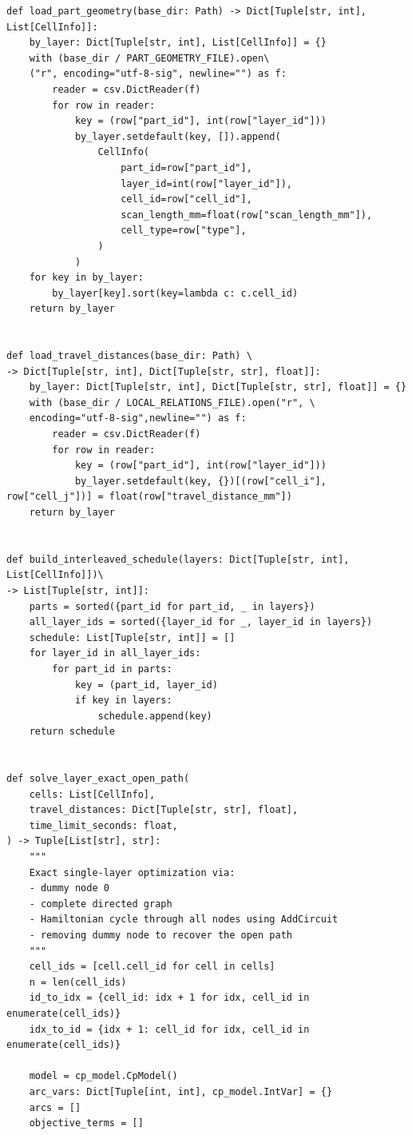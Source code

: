 \documentclass[a4paper, 12pt]{ctexart}
\begin{document}
\begin{verbatim}
def load_part_geometry(base_dir: Path) -> Dict[Tuple[str, int], List[CellInfo]]:
    by_layer: Dict[Tuple[str, int], List[CellInfo]] = {}
    with (base_dir / PART_GEOMETRY_FILE).open\
    ("r", encoding="utf-8-sig", newline="") as f:
        reader = csv.DictReader(f)
        for row in reader:
            key = (row["part_id"], int(row["layer_id"]))
            by_layer.setdefault(key, []).append(
                CellInfo(
                    part_id=row["part_id"],
                    layer_id=int(row["layer_id"]),
                    cell_id=row["cell_id"],
                    scan_length_mm=float(row["scan_length_mm"]),
                    cell_type=row["type"],
                )
            )
    for key in by_layer:
        by_layer[key].sort(key=lambda c: c.cell_id)
    return by_layer


def load_travel_distances(base_dir: Path) \
-> Dict[Tuple[str, int], Dict[Tuple[str, str], float]]:
    by_layer: Dict[Tuple[str, int], Dict[Tuple[str, str], float]] = {}
    with (base_dir / LOCAL_RELATIONS_FILE).open("r", \
    encoding="utf-8-sig",newline="") as f:
        reader = csv.DictReader(f)
        for row in reader:
            key = (row["part_id"], int(row["layer_id"]))
            by_layer.setdefault(key, {})[(row["cell_i"], row["cell_j"])] = float(row["travel_distance_mm"])
    return by_layer


def build_interleaved_schedule(layers: Dict[Tuple[str, int], List[CellInfo]])\
-> List[Tuple[str, int]]:
    parts = sorted({part_id for part_id, _ in layers})
    all_layer_ids = sorted({layer_id for _, layer_id in layers})
    schedule: List[Tuple[str, int]] = []
    for layer_id in all_layer_ids:
        for part_id in parts:
            key = (part_id, layer_id)
            if key in layers:
                schedule.append(key)
    return schedule


def solve_layer_exact_open_path(
    cells: List[CellInfo],
    travel_distances: Dict[Tuple[str, str], float],
    time_limit_seconds: float,
) -> Tuple[List[str], str]:
    """
    Exact single-layer optimization via:
    - dummy node 0
    - complete directed graph
    - Hamiltonian cycle through all nodes using AddCircuit
    - removing dummy node to recover the open path
    """
    cell_ids = [cell.cell_id for cell in cells]
    n = len(cell_ids)
    id_to_idx = {cell_id: idx + 1 for idx, cell_id in enumerate(cell_ids)}
    idx_to_id = {idx + 1: cell_id for idx, cell_id in enumerate(cell_ids)}

    model = cp_model.CpModel()
    arc_vars: Dict[Tuple[int, int], cp_model.IntVar] = {}
    arcs = []
    objective_terms = []


\end{verbatim}
\end{document}
